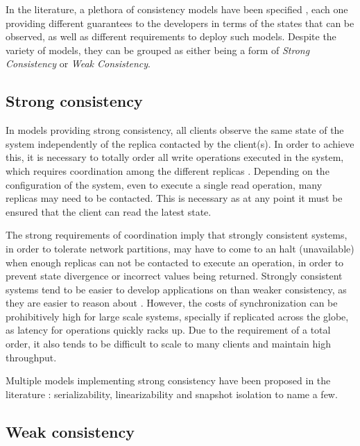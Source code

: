 In the literature, a plethora of consistency models have been specified \cite{linearizability, si, spanner, understandingEC, cops, dynamo, cassandra}, each one providing different guarantees to the developers in terms of the states that can be observed, as well as different requirements to deploy such models.
Despite the variety of models, they can be grouped as either being a form of \emph{Strong Consistency} or \emph{Weak Consistency}.

\subsection{Strong consistency}

In models providing strong consistency, all clients observe the same state of the system independently of the replica contacted by the client(s).
In order to achieve this, it is necessary to totally order all write operations executed in the system, which requires coordination among the different replicas \cite{linearizability, spanner}.
Depending on the configuration of the system, even to execute a single read operation, many replicas may need to be contacted.
This is necessary as at any point it must be ensured that the client can read the latest state.

The strong requirements of coordination imply that strongly consistent systems, in order to tolerate network partitions, may have to come to an halt (unavailable) when enough replicas can not be contacted to execute an operation, in order to prevent state divergence or incorrect values being returned.
Strongly consistent systems tend to be easier to develop applications on than weaker consistency, as they are easier to reason about \cite{spanner}.
However, the costs of synchronization can be prohibitively high for large scale systems, specially if replicated across the globe, as latency for operations quickly racks up.
Due to the requirement of a total order, it also tends to be difficult to scale to many clients and maintain high throughput.

Multiple models implementing strong consistency have been proposed in the literature  \cite{linearizability, si}: serializability, linearizability and snapshot isolation to name a few.

\subsection{Weak consistency}

